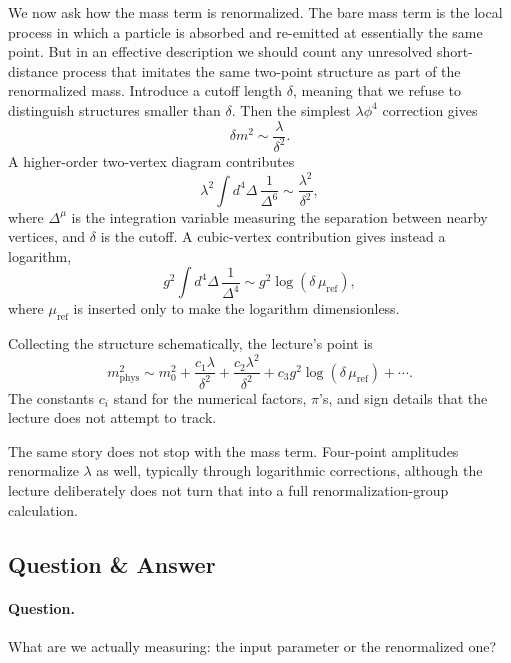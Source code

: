 We now ask how the mass term is renormalized. The bare mass term is the local process in which a particle is absorbed and re-emitted at essentially the same point. But in an effective description we should count any unresolved short-distance process that imitates the same two-point structure as part of the renormalized mass. Introduce a cutoff length \(\delta\), meaning that we refuse to distinguish structures smaller than \(\delta\). Then the simplest \(\lambda\phi^4\) correction gives
\begin{equation}
\delta m^2\sim \frac{\lambda}{\delta^2}.
\end{equation}
A higher-order two-vertex diagram contributes
\begin{equation}
\lambda^2\int d^4\Delta\,\frac{1}{\Delta^6}\sim \frac{\lambda^2}{\delta^2},
\end{equation}
where \(\Delta^\mu\) is the integration variable measuring the separation between nearby vertices, and \(\delta\) is the cutoff. A cubic-vertex contribution gives instead a logarithm,
\begin{equation}
g^2\int d^4\Delta\,\frac{1}{\Delta^4}\sim g^2\log(\delta\,\mu_{\mathrm{ref}}),
\end{equation}
where \(\mu_{\mathrm{ref}}\) is inserted only to make the logarithm dimensionless.

Collecting the structure schematically, the lecture's point is
\begin{equation}
m_{\mathrm{phys}}^2\sim
m_0^2
+\frac{c_1\lambda}{\delta^2}
+\frac{c_2\lambda^2}{\delta^2}
+c_3 g^2\log(\delta\,\mu_{\mathrm{ref}})
+\cdots.
\end{equation}
The constants \(c_i\) stand for the numerical factors, \(\pi\)'s, and sign details that the lecture does not attempt to track.

The same story does not stop with the mass term. Four-point amplitudes renormalize \(\lambda\) as well, typically through logarithmic corrections, although the lecture deliberately does not turn that into a full renormalization-group calculation.

\subsection{Question \& Answer}

\paragraph{Question.} What are we actually measuring: the input parameter or the renormalized one?

